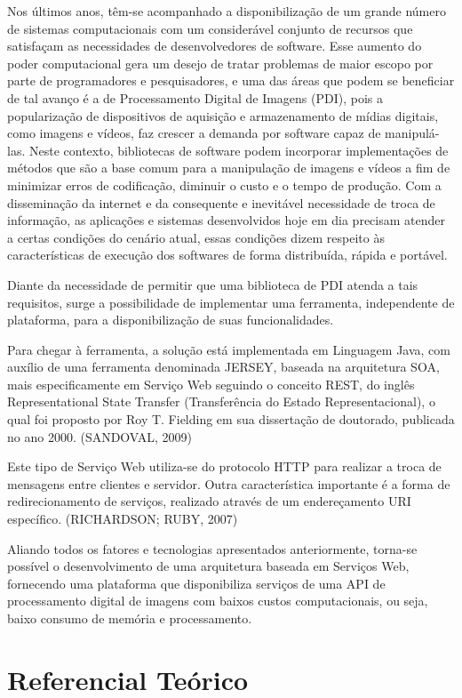 \documentclass[12pt]{article}
\begin{document}
Nos últimos anos, têm-se acompanhado a disponibilização de um grande número de sistemas 
computacionais com um considerável conjunto de recursos que satisfaçam as necessidades de 
desenvolvedores de software. Esse aumento do poder computacional gera um desejo de tratar 
problemas de maior escopo por parte de programadores e pesquisadores, e uma das áreas que podem 
se beneficiar de tal avanço é a de Processamento Digital de Imagens (PDI), pois a popularização 
de dispositivos de aquisição e armazenamento de mídias digitais, como imagens e vídeos, faz 
crescer a demanda por software capaz de manipulá-las. Neste contexto, bibliotecas de software 
podem incorporar implementações de métodos que são a base comum para a manipulação de imagens e 
vídeos a fim de minimizar erros de codificação, diminuir o custo e o tempo de produção. 
Com a disseminação da internet e da consequente e inevitável necessidade de troca de informação, 
as aplicações e sistemas desenvolvidos hoje em dia precisam 
atender a certas condições do cenário atual, essas condições dizem respeito às características 
de execução dos softwares de forma distribuída, rápida e portável. 

Diante da necessidade de permitir que uma biblioteca de PDI atenda a tais requisitos, surge a
possibilidade de implementar uma ferramenta, independente de plataforma, para a
disponibilização de suas funcionalidades.

Para chegar à ferramenta, a solução está implementada em Linguagem
Java, com auxílio de uma ferramenta denominada JERSEY, baseada na arquitetura
SOA, mais especificamente em Serviço Web seguindo o conceito REST, do inglês
Representational State Transfer (Transferência do Estado Representacional), o qual
foi proposto por Roy T. Fielding em sua dissertação de doutorado, publicada no ano
2000. (SANDOVAL, 2009)

Este tipo de Serviço Web utiliza-se do protocolo HTTP para realizar a troca
de mensagens entre clientes e servidor. Outra característica importante é a forma de
redirecionamento de serviços, realizado através de um endereçamento URI
específico. (RICHARDSON; RUBY, 2007)

Aliando todos os fatores e tecnologias apresentados anteriormente, torna-se
possível o desenvolvimento de uma arquitetura baseada em Serviços Web,
fornecendo uma plataforma que disponibiliza serviços de uma API de processamento digital de imagens
com baixos custos computacionais, ou seja, baixo consumo de memória e processamento.

\section{Referencial Teórico} \label{sec:firstpage}
\end{document}
